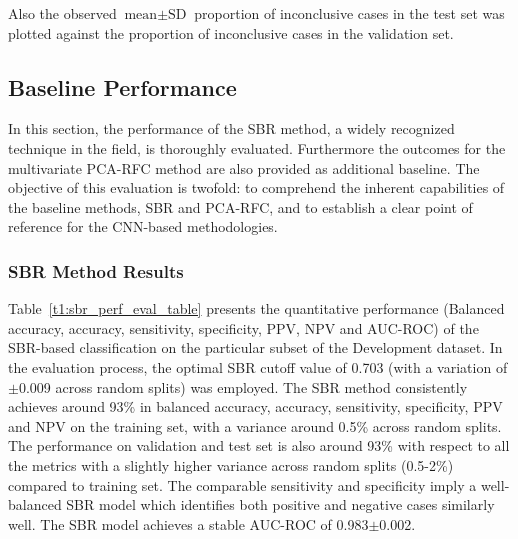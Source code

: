 Also the observed $\text{mean} \pm \text{SD}$ proportion of inconclusive cases in the test set was plotted 
against the proportion of inconclusive cases in the validation set.



\subsection{Baseline Performance}
\label{subsec:baseline_performance}

In this section, the performance of the SBR method, a widely recognized technique in the field, 
is thoroughly evaluated. 
Furthermore the outcomes for the multivariate PCA-RFC method are also provided as additional baseline.
The objective of this evaluation is twofold: to comprehend the inherent capabilities of the baseline methods, SBR and
PCA-RFC, and to establish a clear point of reference for the CNN-based methodologies.

\subsubsection{SBR Method Results}
\label{subsubsec:eval_sbr}




Table~\ref{t1:sbr_perf_eval_table} presents the quantitative performance 
(Balanced accuracy, accuracy, sensitivity, specificity, PPV, NPV and AUC-ROC) of the SBR-based classification on the 
particular subset of the Development dataset.
In the evaluation process, the optimal SBR cutoff value of 0.703 (with a variation of $\pm$0.009 across random splits) 
was employed.
The SBR method consistently achieves around 93\% in balanced accuracy, accuracy, sensitivity, specificity, PPV and NPV 
on the training set, with a variance around 0.5\% across random splits.
The performance on validation and test set is also around 93\% with respect to all the metrics
with a slightly higher variance across random splits (0.5-2\%) compared to training set.
The comparable sensitivity and specificity imply a well-balanced SBR model which 
identifies both positive and negative cases similarly well.
The SBR model achieves a stable AUC-ROC of 0.983$\pm$0.002.


